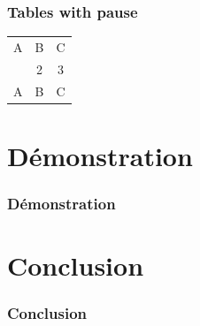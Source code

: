 \documentclass{beamer}
\begin{document}
\begin{frame}\frametitle{Tables with pause}
\begin{tabular}{c c c}
A & B & C \\ 
\pause 
1 & 2 & 3 \\  
\pause 
A & B & C \\ 
\end{tabular} 
\end{frame}


    \section{Démonstration}
        \begin{frame}\frametitle{Démonstration}

        \end{frame}

    \section{Conclusion}
        \begin{frame}\frametitle{Conclusion}

        \end{frame}
\end{document}
